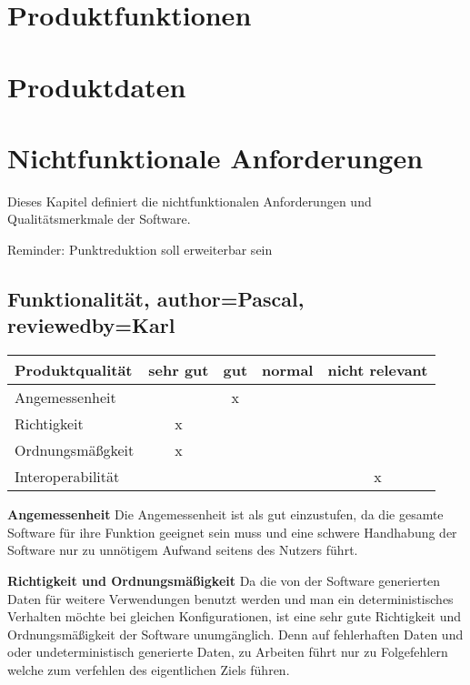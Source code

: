 \documentclass[parskip=full]{scrartcl} %
\begin{document}
\section{Produktfunktionen}
\newpage







\section{Produktdaten}
\newpage







\section{Nichtfunktionale Anforderungen}

Dieses Kapitel definiert die nichtfunktionalen Anforderungen und Qualitätsmerkmale der Software.

Reminder: Punktreduktion soll erweiterbar sein



\subsection{Funktionalität, author=Pascal, reviewedby=Karl}

\begin{tabular}{|l| c| c| c| c|}
    \hline
        Produktqualität & sehr gut & gut & normal & nicht relevant \\
    \hline
        Angemessenheit & & x & &\\
    \hline
        Richtigkeit & x & & &\\
    \hline
        Ordnungsmäßgkeit & x & & &\\
    \hline
        Interoperabilität & & & & x\\
    \hline
        
    \end{tabular}

\textbf{Angemessenheit}
\newline
Die Angemessenheit ist als gut einzustufen, da die gesamte Software für ihre Funktion geeignet sein muss und eine schwere Handhabung der Software nur zu unnötigem Aufwand seitens des Nutzers führt.



\textbf{Richtigkeit und Ordnungsmäßigkeit}
\newline
Da die von der Software generierten Daten für weitere Verwendungen benutzt werden und man ein deterministisches Verhalten möchte bei gleichen Konfigurationen, ist eine sehr gute Richtigkeit und Ordnungsmäßigkeit der Software unumgänglich. Denn auf fehlerhaften Daten und oder undeterministisch generierte Daten, zu Arbeiten führt nur zu Folgefehlern welche zum verfehlen des eigentlichen Ziels führen.
\end{document}
